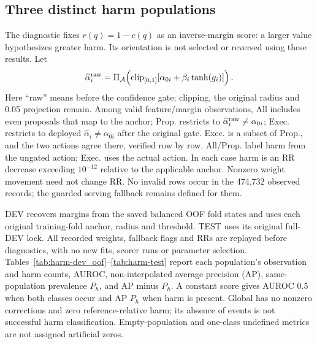 \documentclass[11pt,a4paper]{article}
\newcommand{\Agrid}{\mathcal{A}}
\begin{document}


\FloatBarrier

\subsection{Three distinct harm populations}
The diagnostic fixes $r(q)=1-c(q)$ as an inverse-margin score: a larger value hypothesizes greater harm. Its orientation is not selected or reversed using these results. Let
\begin{equation}
\widehat\alpha_i^{\rm raw}=\Pi_{\Agrid}\!\left(\operatorname{clip}_{[0,1]}[\alpha_{0i}+\beta_i\tanh(g_i)]\right).
\label{eq:harm-raw-proposal}
\end{equation}
Here ``raw'' means before the confidence gate; clipping, the original radius and 0.05 projection remain. Among valid feature/margin observations, All includes even proposals that map to the anchor; Prop. restricts to $\widehat\alpha_i^{\rm raw}\ne\alpha_{0i}$; Exec. restricts to deployed $\widehat\alpha_i\ne\alpha_{0i}$ after the original gate. Exec. is a subset of Prop., and the two actions agree there, verified row by row. All/Prop. label harm from the ungated action; Exec. uses the actual action. In each case harm is an RR decrease exceeding $10^{-12}$ relative to the applicable anchor. Nonzero weight movement need not change RR. No invalid rows occur in the 474,732 observed records; the guarded serving fallback remains defined for them.

DEV recovers margins from the saved balanced OOF fold states and uses each original training-fold anchor, radius and threshold. TEST uses its original full-DEV lock. All recorded weights, fallback flags and RRs are replayed before diagnostics, with no new fits, scorer runs or parameter selection. Tables~\ref{tab:harm-dev_oof}--\ref{tab:harm-test} report each population's observation and harm counts, AUROC, non-interpolated average precision (AP), same-population prevalence $P_h$, and AP minus $P_h$. A constant score gives AUROC 0.5 when both classes occur and AP $P_h$ when harm is present. Global has no nonzero corrections and zero reference-relative harm; its absence of events is not successful harm classification. Empty-population and one-class undefined metrics are not assigned artificial zeros.
\end{document}
